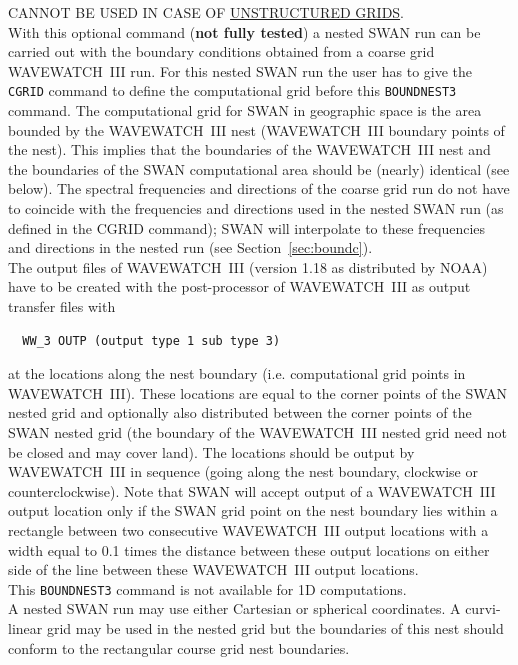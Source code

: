 \documentclass[12pt]{book}
\begin{document}
\noindent
CANNOT BE USED IN CASE OF \underline{UNSTRUCTURED GRIDS}.
\\[2ex]
\noindent
With this optional command ({\bf not fully tested}) a nested SWAN run can be carried out with the boundary
conditions obtained from a coarse grid WAVEWATCH~III run. For this nested SWAN run the user has to
give the {\tt CGRID} command to define the computational grid before this {\tt BOUNDNEST3} command. The
computational grid for SWAN in geographic space is the area bounded by the WAVEWATCH~III nest
(WAVEWATCH~III boundary points of the nest). This implies that the boundaries of the WAVEWATCH~III nest
and the boundaries of the SWAN computational area should be (nearly) identical (see below). The
spectral frequencies and directions of the coarse grid run do not have to coincide with the frequencies
and directions used in the nested SWAN run (as defined in the CGRID command); SWAN will interpolate
to these frequencies and directions in the nested run (see Section~\ref{sec:boundc}).
\\[2ex]
\noindent
The output files of WAVEWATCH~III (version 1.18 as distributed by NOAA) have to be created with the post-processor
of WAVEWATCH~III as output transfer files with
\begin{verbatim}
  WW_3 OUTP (output type 1 sub type 3)
\end{verbatim}
at the locations along the nest boundary  (i.e. computational grid points in WAVEWATCH~III). These
locations are equal to the corner points of the SWAN nested grid and optionally also distributed between
the corner points of the SWAN nested grid (the boundary of the WAVEWATCH~III nested grid need not be
closed and may cover land). The locations should be output by WAVEWATCH~III in sequence (going along
the nest boundary, clockwise or counterclockwise). Note that SWAN will accept output of  a
WAVEWATCH~III output location only if the SWAN grid point on the nest boundary lies within a rectangle
between two consecutive WAVEWATCH~III output locations with a width equal to 0.1 times the distance
between these output locations on either side of the line between these WAVEWATCH~III output locations.
\\[2ex]
\noindent
This {\tt BOUNDNEST3} command is not available for 1D computations.
\\[2ex]
\noindent
A nested SWAN run may use either Cartesian or spherical coordinates. A curvi-linear grid may be used
in the nested grid but the boundaries of this nest should conform to the rectangular course grid nest
boundaries.
\end{document}
